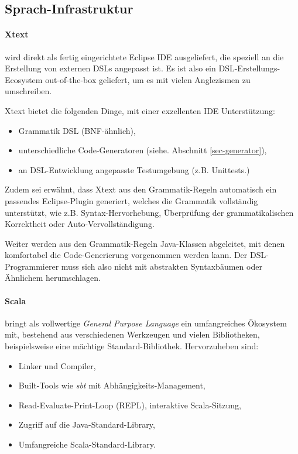 \begin{landscape}
\begin{longtable}{|p{0.8cm}|p{4.4cm}|p{6.4cm}|p{6.4cm}|}
\end{longtable}
\newpage
\end{landscape}


\subsection{Sprach-Infrastruktur}\label{sec-infrastruktur}

\paragraph{Xtext} wird direkt als fertig eingerichtete Eclipse IDE
ausgeliefert, die speziell an die Erstellung von externen DSLs angepasst
ist. Es ist also ein DSL-Erstellungs-Ecosystem out-of-the-box geliefert,
um es mit vielen Anglezismen zu umschreiben.

Xtext bietet die folgenden Dinge, mit einer exzellenten IDE Unterstützung:

\begin{itemize}
  \item Grammatik DSL (BNF-ähnlich),
  \item unterschiedliche Code-Generatoren (siehe. Abschnitt \ref{sec-generator}),
  \item an DSL-Entwicklung angepasste Testumgebung (z.B. Unittests.)
\end{itemize}

Zudem sei erwähnt, dass Xtext aus den Grammatik-Regeln automatisch ein
passendes Eclipse-Plugin generiert, welches die Grammatik vollständig
unterstützt, wie z.B. Syntax-Hervorhebung, Überprüfung der grammatikalischen
Korrektheit oder Auto-Vervollständigung.

Weiter werden aus den Grammatik-Regeln Java-Klassen abgeleitet, mit denen
komfortabel die Code-Generierung vorgenommen werden kann. Der DSL-Programmierer
muss sich also nicht mit abstrakten Syntaxbäumen oder Ähnlichem herumschlagen.

\paragraph{Scala} bringt als vollwertige \emph{General Purpose Language}
ein umfangreiches Ökosystem mit, bestehend aus verschiedenen Werkzeugen
und vielen Bibliotheken, beispielsweise eine mächtige Standard-Bibliothek.
Hervorzuheben sind:

\begin{itemize}
  \item Linker und Compiler,
  \item Built-Tools wie \emph{sbt} mit Abhängigkeits-Management,
  \item Read-Evaluate-Print-Loop (REPL), interaktive Scala-Sitzung,
  \item Zugriff auf die Java-Standard-Library,
  \item Umfangreiche Scala-Standard-Library.
\end{itemize}

